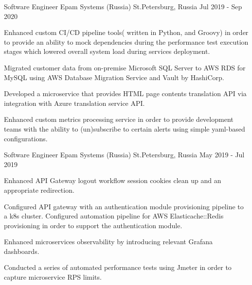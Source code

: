 \begin{cventries}
\cventry
{Software Engineer} %
{Epam Systems (Russia)} %
{St.Petersburg, Russia} %
{Jul 2019 - Sep 2020} %
{
  \begin{cvitems} %
    \item { Enhanced custom CI/CD pipeline tools( written in Python, and Groovy) 
    in order to provide an ability to mock dependencies during the performance test execution stages
     which lowered overall system load during services deployment.}
    \item {Migrated customer data from on-premise Microsoft SQL Server to AWS RDS for MySQL using AWS Database Migration Service and Vault by HashiCorp.}
    \item {Developed a microservice that provides HTML page contents translation API via integration with Azure translation service API.}
    \item {Enhanced custom metrics processing service in order to provide development teams with the ability to (un)subscribe to certain alerts using simple yaml-based configurations.}
  \end{cvitems}
}

\cventry
{Software Engineer} %
{Epam Systems (Russia)} %
{St.Petersburg, Russia} %
{May 2019 - Jul 2019} %
{
  \begin{cvitems} %
    \item {Enhanced API Gateway logout workflow session cookies clean up and an appropriate redirection.}
    \item {Configured API gateway with an authentication module provisioning pipeline to a k8s cluster. 
    Configured automation pipeline for AWS Elasticache::Redis provisioning in order to support the authentication module.}
    \item {Enhanced microservices observability by introducing relevant Grafana dashboards.}
    \item {Conducted a series of automated performance tests using Jmeter in order to capture microservice RPS limits.}
  \end{cvitems}
}


\end{cventries}
